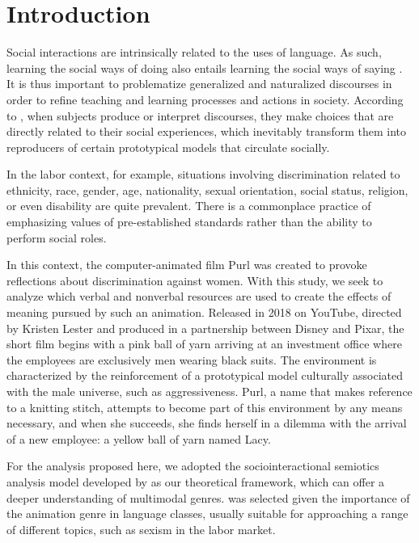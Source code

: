 \documentclass[english]{textolivre}
\begin{document}
\begin{polyabstract}
\begin{portuguese}
\begin{abstract}
\end{abstract}
\end{portuguese}
\end{polyabstract}

\section{Introduction}

Social interactions are intrinsically related to the uses of language. As such, learning the social ways of doing also entails learning the social ways of saying \cite{bakhtin2011estetica}. It is thus important to problematize generalized and naturalized discourses in order to refine teaching and learning processes and actions in society. According to \textcite{kress2006reading}, when subjects produce or interpret discourses, they make choices that are directly related to their social experiences, which inevitably transform them into reproducers of certain prototypical models that circulate socially.

In the labor context, for example, situations involving discrimination related to ethnicity, race, gender, age, nationality, sexual orientation, social status, religion, or even disability are quite prevalent. There is a commonplace practice of emphasizing values of pre-established standards rather than the ability to perform social roles.

In this context, the computer-animated film Purl was created to provoke reflections about discrimination against women. With this study, we seek to analyze which verbal and nonverbal resources are used to create the effects of meaning pursued by such an animation. Released in 2018 on YouTube, directed by Kristen Lester and produced in a partnership between Disney and Pixar, the short film begins with a pink ball of yarn arriving at an investment office where the employees are exclusively men wearing black suits. The environment is characterized by the reinforcement of a prototypical model culturally associated with the male universe, such as aggressiveness. Purl, a name that makes reference to a knitting stitch, attempts to become part of this environment by any means necessary, and when she succeeds, she finds herself in a dilemma with the arrival of a new employee: a yellow ball of yarn named Lacy.

For the analysis proposed here, we adopted the sociointeractional semiotics analysis model developed by \textcite{leal2011organizaccao} as our theoretical framework, which can offer a deeper understanding of multimodal genres. \textcite{purl} was selected given the importance of the animation genre in language classes, usually suitable for approaching a range of different topics, such as sexism in the labor market.
\end{document}
